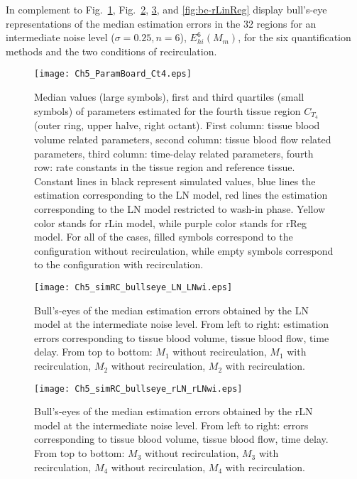In complement to Fig.~\ref{fig:estpar4}, Fig.~\ref{fig:be-LN}, \ref{fig:be-rLN}, and \ref{fig:be-rLinReg} display bull's-eye representations of the median estimation errors in the 32 regions for an intermediate noise level ($\sigma=0.25, n=6$), $E_{hi}^{6}(M_m)$, for the six quantification methods and the two conditions of recirculation. 
\begin{figure}
\center
\texttt{[image: Ch5\_ParamBoard\_Ct4.eps]}
\caption{Median values (large symbols), first and third quartiles (small symbols) of parameters estimated for the fourth tissue region $C_{T_4}$ (outer ring, upper halve, right octant). First column: tissue blood volume related parameters, second column: tissue blood flow related parameters, third column: time-delay related parameters, fourth row: rate constants in the tissue region and reference tissue. Constant lines in black represent simulated values, blue lines the estimation corresponding to the LN model, red lines the estimation corresponding to the LN model restricted to wash-in phase. Yellow color stands for rLin model, while purple color stands for rReg model. For all of the cases, filled symbols correspond to the configuration without recirculation, while empty symbols correspond to the configuration with recirculation.}
\label{fig:estpar4}
\vspace{-3mm}
\end{figure}

\begin{figure}
\center
\texttt{[image: Ch5\_simRC\_bullseye\_LN\_LNwi.eps]}
\caption{Bull's-eyes of the median estimation errors obtained by the LN model at the intermediate noise level. From left to right: estimation errors corresponding to tissue blood volume, tissue blood flow, time delay. From top to bottom: $M_1$ without recirculation, $M_1$ with recirculation, $M_2$ without recirculation, $M_2$ with recirculation.}
\label{fig:be-LN}
\vspace{-3mm}
\end{figure}

\begin{figure}
\center
\texttt{[image: Ch5\_simRC\_bullseye\_rLN\_rLNwi.eps]}
\caption{Bull's-eyes of the median estimation errors obtained by the rLN model at the intermediate noise level. From left to right: errors corresponding to tissue blood volume, tissue blood flow, time delay. From top to bottom: $M_3$ without recirculation, $M_3$ with recirculation, $M_4$ without recirculation, $M_4$ with recirculation.}
\label{fig:be-rLN}
\vspace{-3mm}
\end{figure}

